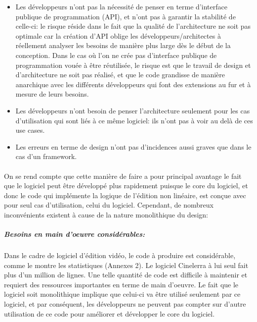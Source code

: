 \begin{itemize} \setlength{\itemsep}{2mm}

  \item {Les développeurs n'ont pas la nécessité de penser
    en terme d'interface publique de programmation (API), et
    n'ont pas à garantir la stabilité de celle-ci: le risque réside
    dans le fait que la qualité de l'architecture ne soit pas optimale
    car la création d'API oblige les développeurs/architectes
    à réellement analyser les besoins de manière plus large dès
    le début de la conception. Dans le cas où l'on ne crée pas
    d'interface publique de programmation vouée à être réutilisée,
    le risque est que le travail de design et d'architecture ne soit
    pas réalisé, et que le code grandisse de manière anarchique avec
    les différents développeurs qui font des extensions au fur et à
    mesure de leurs besoins.}

  \item {Les développeurs n'ont besoin de penser l'architecture seulement
  pour les cas d'utilisation qui sont liés à ce même logiciel:
    ils n'ont pas à voir au delà de ces use cases.}

  \item {Les erreurs en terme de design n'ont pas d'incidences aussi
    graves que dans le cas d'un framework.}
\end {itemize}

\paragraph{}

On se rend compte que cette manière de faire a pour principal avantage
le fait que le logiciel peut être développé plus rapidement puisque
le core du logiciel, et donc le code qui implémente la logique de
l'édition non linéaire, est conçue avec pour seul cas d'utilisation,
celui du logiciel. Cependant, de nombreux inconvénients existent à
cause de la nature monolithique du design:

\subparagraph{Besoins en main d'oeuvre considérables:}

\subparagraph { }

Dans le cadre de logiciel d'édition vidéo, le code à produire est
considérable, comme le montre les statistiques (Annexes 2). Le logiciel
Cinelerra à lui seul fait plus d'un million de lignes. Une telle
quantité de code est difficile à maintenir et requiert des ressources
importantes en terme de main d'oeuvre. Le fait que le logiciel soit
monolithique implique que celui-ci va être utilisé
seulement par ce logiciel, et par conséquent, les développeurs ne
peuvent pas compter sur d'autre utilisation de ce code pour améliorer
et développer le core du logiciel.

